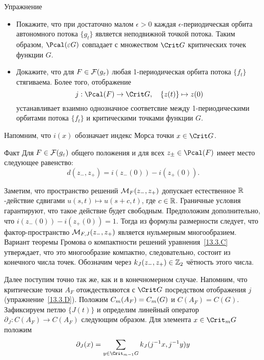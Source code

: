 \begin{ex}{Упражнение}\label{13.3.D}
  \begin{itemize}
  \item
    Покажите, что при достаточно малом $\epsilon > 0$ каждая
    $\epsilon$-пе\-ри\-оди\-чес\-кая орбита автономного потока $\{g_{t}\}$
    является неподвижной точкой потока. Таким образом, $\Pcal(\epsilon
    G)$ совпадает с множеством $\Crit G$ критических точек функции $G$.
  \item
    Докажите, что для $F\in\mathcal{F}(g_{\varepsilon})$ любая 1-периодическая
    орбита потока $\{f_{t}\}$ стягиваема. 
    Более того, отображение
    \[
    j : \Pcal(F)\to\Crit G,
    \quad
    \{z(t)\}\mapsto z(0)
    \]
    устанавливает взаимно однозначное соответсвие между
    1-пе\-ри\-оди\-чес\-кими орбитами потока $\{f_{t}\}$ и критическими
    точками функции $G$.
  \end{itemize}
\end{ex}


Напомним, что $i(x)$ обозначает индекс Морса точки $x\in\Crit G$.

\begin{thm}{Факт}\label{13.3.E}
Для $F\in\mathcal{F}(g_{\varepsilon})$ общего положения и для всех $z_{\pm}\in\Pcal(F)$ имеет место следующее равенство:
\[d(z_{-}, z_{+}) = i(z_{-}(0)) - i(z_{+}(0)).\]
\end{thm}

Заметим, что пространство решений $\mathcal{M}_{F}(z_{-},z_{+})$ допускает
естественное $\mathbb{R}$-действие сдвигами $u(s, t)\mapsto u(s+c, t)$, где
$c\in\mathbb{R}$.
Граничные условия гарантируют, что такое действие будет свободным.
Предположим дополнительно, что $ i(z_{-}(0)) - i(z_{+}(0)) = 1$.
Тогда из формулы размерности следует, что
фактор-пространство $\mathcal{M}_{F,J}(z_{-},z_{+})$ является нульмерным
многообразием.
Вариант теоремы Громова о компактности решений
уравнения~\ref{13.3.C} утверждает, что это многообразие компактно,
следовательно, состоит из конечного числа точек.
Обозначим через $k_{J}(z_{-},z_{+})\in\mathbb{Z}_{2}$ чётность этого числа.

Далее поступим точно так же, как и в конечномерном случае.
Напомним, что критические точки $A_{F}$ отождествляются с $\Crit G$
посредством отображения $j$ (упражнение~\ref{13.3.D}).
Положим $C_{m}(A_{F}) \z= C_{m}(G)$ и $C(A_{F}) = C(G)$.
Зафиксируем петлю $\{J(t)\}$ и определим линейный оператор
$\partial_{J}:C(A_{F})\to C(A_{F})$ следующим образом.
Для элемента $x\in\Crit_{m} G$ положим
\[
\partial_{J}(x)=\sum_{y\in\Crit_{m-1}G}k_{J}(j^{-1}x,j^{-1}y)y
\]


